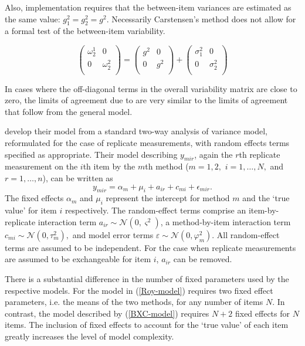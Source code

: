\documentclass[12pt, a4paper]{report}
\theoremstyle{plain}
\theoremstyle{definition}
\theoremstyle{remark}
\begin{document}
	Also, implementation requires that the between-item variances are
	estimated as the same value: $g^2_1 = g^2_2 = g^2$. Necessarily
	Carstensen's method does not allow for a formal test of the
	between-item variability.
	
	\[\left(\begin{array}{cc}
	\omega^1_2  & 0 \\
	0 & \omega^2_2 \\
	\end{array}  \right)
	=  \left(
	\begin{array}{cc}
	g^2  & 0 \\
	0 & g^2 \\
	\end{array} \right)+
	\left(
	\begin{array}{cc}
	\sigma^2_1  & 0 \\
	0 & \sigma^2_2 \\
	\end{array}\right)
	\]
	
	In cases where the off-diagonal terms in the overall variability
	matrix are close to zero, the limits of agreement due to
	\citet{BXC2008} are very similar to the limits of agreement that
	follow from the general model.
	
	
	
	\citet{BXC2008} develop their model from a standard two-way analysis of variance model, reformulated for the case of replicate measurements, with random effects terms specified as appropriate. 
	Their model describing $y_{mir} $, again the $r$th replicate measurement on the $i$th item by the $m$th method ($m=1,2,$ $i=1,\ldots,N,$ and $r = 1,\ldots,n$), can be written as
	\begin{equation}\label{BXC-model}
	y_{mir}  = \alpha_{m} + \mu_{i} + a_{ir} + c_{mi} + \epsilon_{mir}.
	\end{equation}
	The fixed effects $\alpha_{m}$ and $\mu_{i}$  represent the intercept for method $m$ and the `true value' for item $i$ respectively. The random-effect terms comprise an item-by-replicate interaction term $a_{ir} \sim \mathcal{N}(0,\varsigma^{2})$, a method-by-item interaction term $c_{mi} \sim \mathcal{N}(0,\tau^{2}_{m}),$ and model error terms $\varepsilon \sim \mathcal{N}(0,\varphi^{2}_{m}).$ All random-effect terms are assumed to be independent.
	For the case when replicate measurements are assumed to be exchangeable for item $i$, $a_{ir}$ can be removed.
	
	There is a substantial difference in the number of fixed parameters used by the respective models. For the model in (\ref{Roy-model}) requires two fixed effect parameters, i.e. the means of the two methods, for any number of items $N$. In contrast, the model described by (\ref{BXC-model}) requires $N+2$ fixed effects for $N$ items. The inclusion of fixed effects to account for the `true value' of each item greatly increases the level of model complexity.
	
\end{document}
